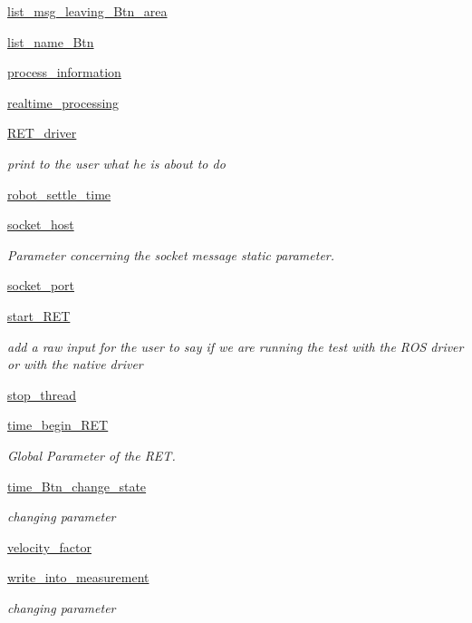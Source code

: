 \begin{DoxyCompactItemize}
\hyperlink{a00037_a051dd22176f65ef9829876c5e1945d4d}{list\+\_\+msg\+\_\+leaving\+\_\+\+Btn\+\_\+area}
\item 
\hyperlink{a00037_a9a4bc6402585ce516fbe5b644a16e744}{list\+\_\+name\+\_\+\+Btn}
\item 
\hyperlink{a00037_a0ef4823e8e47ce910902073a9aedd967}{process\+\_\+information}
\item 
\hyperlink{a00037_af2a2ac723aa44a55553ba4be39e06b56}{realtime\+\_\+processing}
\item 
\hyperlink{a00037_accada53c1f876f08e9c5beb661846ca1}{R\+E\+T\+\_\+driver}
\begin{DoxyCompactList}\small\item\em print to the user what he is about to do \end{DoxyCompactList}\item 
\hyperlink{a00037_a153ea6721b57c14eea55728d46eae779}{robot\+\_\+settle\+\_\+time}
\item 
\hyperlink{a00037_afc570ca4c1952bb0a14a0511160df54a}{socket\+\_\+host}
\begin{DoxyCompactList}\small\item\em Parameter concerning the socket message static parameter. \end{DoxyCompactList}\item 
\hyperlink{a00037_a736f9eb916b0d398d68fc3e0c8f3f953}{socket\+\_\+port}
\item 
\hyperlink{a00037_a86980a8ab0c107b54b619f55e7bd734e}{start\+\_\+\+R\+ET}
\begin{DoxyCompactList}\small\item\em add a raw input for the user to say if we are running the test with the R\+OS driver or with the native driver \end{DoxyCompactList}\item 
\hyperlink{a00037_af2f1a29cc5253b5864a2a65ee823983d}{stop\+\_\+thread}
\item 
\hyperlink{a00037_a0fc681ced6250a0d860270ba7db63e5a}{time\+\_\+begin\+\_\+\+R\+ET}
\begin{DoxyCompactList}\small\item\em Global Parameter of the R\+ET. \end{DoxyCompactList}\item 
\hyperlink{a00037_a13cf0cbef751ce5a38cbc978969dac95}{time\+\_\+\+Btn\+\_\+change\+\_\+state}
\begin{DoxyCompactList}\small\item\em changing parameter \end{DoxyCompactList}\item 
\hyperlink{a00037_a082e6ba9804a6094336b4c267262460e}{velocity\+\_\+factor}
\item 
\hyperlink{a00037_ab7ecf57e4e15355326fd625e3a331cc7}{write\+\_\+into\+\_\+measurement}
\begin{DoxyCompactList}\small\item\em changing parameter \end{DoxyCompactList}\end{DoxyCompactItemize}


